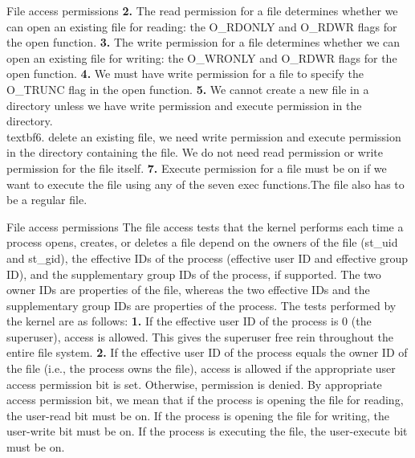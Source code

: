 \documentclass{beamer}
\begin{document}
\begin{frame}[t]{File access permissions}
\textbf{2.} The read permission for a file determines whether we can open an existing file for
reading: the O\_RDONLY and O\_RDWR flags for the open function.
\textbf{3.} The write permission for a file determines whether we can open an existing file for
writing: the O\_WRONLY and O\_RDWR flags for the open function.
\textbf{4.} We must have write permission for a file to specify the O\_TRUNC flag in the open
function.
\textbf{5.} We cannot create a new file in a directory unless we have write permission and
execute permission in the directory.
\\textbf{6.} delete an existing file, we need write permission and execute permission in the
directory containing the file. We do not need read permission or write permission
for the file itself.
\textbf{7.} Execute permission for a file must be on if we want to execute the file using any of
the seven exec functions.The file also has to be a regular file.







\end{frame}
\begin{frame}[t]{File access permissions}
The file access tests that the kernel performs each time a process opens, creates, or
deletes a file depend on the owners of the file (st\_uid and st\_gid), the effective IDs
of the process (effective user ID and effective group ID), and the supplementary group
IDs of the process, if supported. The two owner IDs are properties of the file, whereas
the two effective IDs and the supplementary group IDs are properties of the process.
The tests performed by the kernel are as follows:
\textbf{1.} If the effective user ID of the process is 0 (the superuser), access is allowed. This
gives the superuser free rein throughout the entire file system.
\textbf{2.} If the effective user ID of the process equals the owner ID of the file (i.e., the
process owns the file), access is allowed if the appropriate user access
permission bit is set. Otherwise, permission is denied. By appropriate access
permission bit, we mean that if the process is opening the file for reading, the
user-read bit must be on. If the process is opening the file for writing, the
user-write bit must be on. If the process is executing the file, the user-execute bit
must be on.






\end{frame}
\end{document}
